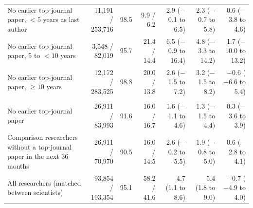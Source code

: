 \begin{table}[H]
\begin{tabularx}{\linewidth}{>{\raggedright\arraybackslash}Xrrrrrr}
No earlier top-journal paper, $<5$ years as last author & \makecell[rt]{11,191 /\\253,716} & 98.5 & 9.9 / 6.2 & \makecell[rt]{2.9\\($-$0.1 to 6.5)} & \makecell[rt]{2.3\\($-$0.7 to 5.8)} & \makecell[rt]{0.6\\($-$3.8 to 4.6)} \\
No earlier top-journal paper, 5 to $<10$ years & \makecell[rt]{3,548 /\\82,019} & 95.7 & 21.4 / 14.4 & \makecell[rt]{6.5\\($-$0.9 to 16.4)} & \makecell[rt]{4.8\\($-$3.3 to 14.2)} & \makecell[rt]{1.7\\($-$10.0 to 13.2)} \\
No earlier top-journal paper, $\geq 10$ years & \makecell[rt]{12,172 /\\283,525} & 98.8 & 20.0 / 13.8 & \makecell[rt]{2.6\\($-$1.5 to 7.2)} & \makecell[rt]{3.2\\($-$1.5 to 8.2)} & \makecell[rt]{$-$0.6\\($-$6.6 to 5.4)} \\
\multicolumn{7}{>{\raggedright\arraybackslash}p{\dimexpr\textwidth-2\tabcolsep\relax}}{\textit{Against near-top journals}} \\
No earlier top-journal paper & \makecell[rt]{26,911 /\\83,993} & 91.6 & 16.0 / 16.7 & \makecell[rt]{1.6\\($-$1.1 to 4.6)} & \makecell[rt]{1.3\\($-$1.5 to 4.4)} & \makecell[rt]{0.3\\($-$3.6 to 3.9)} \\
Comparison researchers without a top-journal paper in the next 36 months & \makecell[rt]{26,911 /\\70,970} & 90.5 & 16.0 / 14.5 & \makecell[rt]{2.6\\($-$0.2 to 5.5)} & \makecell[rt]{1.9\\($-$0.8 to 5.0)} & \makecell[rt]{0.6\\($-$2.8 to 4.1)} \\
All researchers (matched between scientists) & \makecell[rt]{93,854 /\\193,354} & 95.1 & 58.2 / 41.6 & \makecell[rt]{4.7\\(1.1 to 8.6)} & \makecell[rt]{5.4\\(1.8 to 9.0)} & \makecell[rt]{$-$0.7\\($-$4.9 to 4.0)} \\

\end{tabularx}
\end{table}
